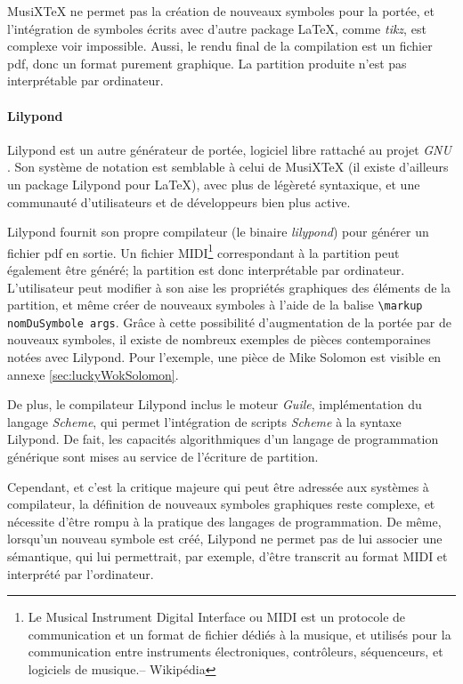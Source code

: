 MusiXTeX ne permet pas la création de nouveaux symboles pour la portée, et l'intégration de symboles écrits avec d'autre package \LaTeX, comme \textit{tikz}, est complexe voir impossible.
Aussi, le rendu final de la compilation est un fichier pdf, donc un format purement graphique. La partition produite n'est pas interprétable par ordinateur.

\paragraph{Lilypond} Lilypond est un autre générateur de portée, logiciel libre rattaché au projet \textit{GNU} \cite{lilypond2018}. Son système de notation est semblable à celui de MusiXTeX (il existe d'ailleurs un package Lilypond pour \LaTeX), avec plus de légèreté syntaxique, et une communauté d'utilisateurs et de développeurs bien plus active.

Lilypond fournit son propre compilateur (le binaire \textit{lilypond}) pour générer un fichier pdf en sortie. Un fichier MIDI\footnote{\og Le Musical Instrument Digital Interface ou MIDI est un protocole de communication et un format de fichier dédiés à la musique, et utilisés pour la communication entre instruments électroniques, contrôleurs, séquenceurs, et logiciels de musique.\fg -- Wikipédia} correspondant à la partition peut également être généré; la partition est donc interprétable par ordinateur.
L'utilisateur peut modifier à son aise les propriétés graphiques des éléments de la partition, et même créer de nouveaux symboles à l'aide de la balise \lstinline|\markup nomDuSymbole args|. Grâce à cette possibilité d'augmentation de la portée par de nouveaux symboles, il existe de nombreux exemples de pièces contemporaines notées avec Lilypond. Pour l'exemple, une pièce de Mike Solomon est visible en annexe \ref{sec:luckyWokSolomon}.

De plus, le compilateur Lilypond inclus le moteur \textit{Guile}, implémentation du langage \textit{Scheme}, qui permet l'intégration de scripts \textit{Scheme} à la syntaxe Lilypond. De fait, les capacités algorithmiques d'un langage de programmation générique sont mises au service de l'écriture de partition.

Cependant, et c'est la critique majeure qui peut être adressée aux systèmes à compilateur, la définition de nouveaux symboles graphiques reste complexe, et nécessite d'être rompu à la pratique des langages de programmation.
De même, lorsqu'un nouveau symbole est créé, Lilypond ne permet pas de lui associer une sémantique, qui lui permettrait, par exemple, d'être transcrit au format MIDI et interprété par l'ordinateur.

